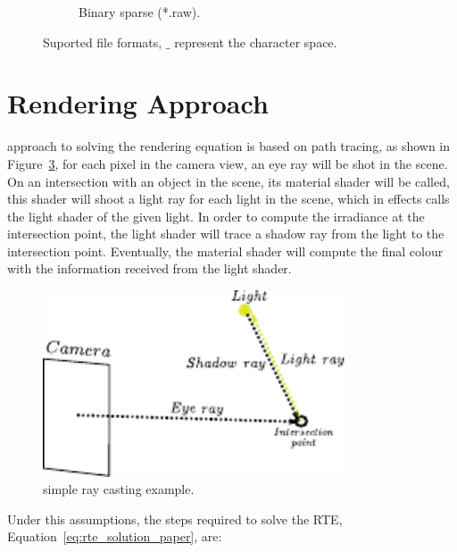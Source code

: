 \begin{figure}[htpb!]
\begin{subfigure}[t]{0.282\textwidth}
                \caption{Binary sparse (*.raw).}
                \label{fig:file_format_binary}
        \end{subfigure}
        \caption{Suported file formats, $\_$ represent the character space.}
        \label{fig:file_format}
\end{figure}

\section{\MentalRay Rendering Approach}
\label{sec:mental_ray_rendering_approach}

\MentalRay approach to solving the rendering equation is based on path tracing, as shown in Figure~\ref{fig:mental_ray_model}, for each pixel in the camera view, an eye ray will be shot in the scene.
On an intersection with an object in the scene, its material shader will be called, this shader will shoot a light ray for each light in the scene, which in effects calls the light shader of the given light.
In order to compute the irradiance at the intersection point, the light shader will trace a shadow ray from the light to the intersection point.
Eventually, the material shader will compute the final colour with the information received from the light shader. 

\begin{figure}[htbp!]
\centering
\includegraphics[width=0.8\textwidth]{img/mental_ray_model}
	\caption{\MentalRay simple ray casting example.}
	\label{fig:mental_ray_model}
\end{figure}

Under this assumptions, the steps required to solve the RTE, Equation~\ref{eq:rte_solution_paper}, are:

